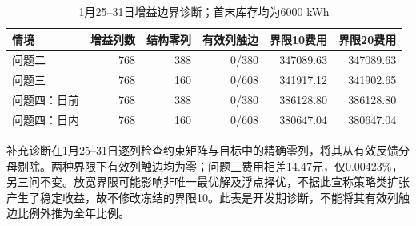 \begin{table}[H]\centering\small
\caption{1月25--31日增益边界诊断；首末库存均为6000 kWh}
\label{tab:revision-gain}
\begin{tabular}{lrrrrr}\toprule
情境 & 增益列数 & 结构零列 & 有效列触边 & 界限10费用 & 界限20费用\\\midrule
问题二 & 768 & 388 & 0/380 & 347089.63 & 347089.63 \\
问题三 & 768 & 160 & 0/608 & 341917.12 & 341902.65 \\
问题四：日前 & 768 & 388 & 0/380 & 386128.80 & 386128.80 \\
问题四：日内 & 768 & 160 & 0/608 & 380647.04 & 380647.04 \\
\bottomrule\end{tabular}\end{table}

补充诊断在1月25--31日逐列检查约束矩阵与目标中的精确零列，将其从有效反馈分母剔除。两种界限下有效列触边均为零；问题三费用相差14.47元，仅0.00423\%，另三问不变。放宽界限可能影响非唯一最优解及浮点择优，不据此宣称策略类扩张产生了稳定收益，故不修改冻结的界限10。此表是开发期诊断，不能将其有效列触边比例外推为全年比例。
